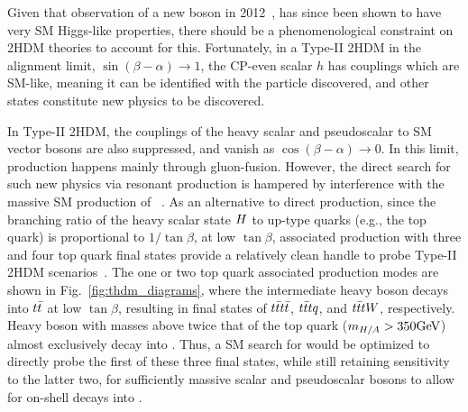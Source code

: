 Given that observation of a new boson in 2012~\cite{CMS:HiggsObservation,ATLAS:HiggsObservation},
has since been shown to have very SM Higgs-like properties,
there should be a phenomenological constraint on 2HDM theories to
account for this. Fortunately, in a Type-II 2HDM in the alignment limit,
$\sin(\beta-\alpha)\rightarrow 1$,
the CP-even scalar $h$ has
couplings which are SM-like, meaning it can be identified with the particle
discovered, and other states constitute new physics to be discovered.

In Type-II 2HDM, the couplings of the heavy scalar and pseudoscalar to SM
vector bosons are also suppressed, and vanish as
$\cos(\beta-\alpha)\rightarrow 0$. In this limit, production happens mainly
through gluon-fusion. However, the direct search for such new physics via
resonant \ttbar production is hampered by interference with the massive SM
production of \ttbar~\cite{THEORY:Gaemers1984sj,THEORY:Dicus1994bm}. As an
alternative to direct production, since the branching ratio of the heavy
scalar state $H$ to up-type quarks (e.g., the top quark) is proportional to
$1/\tan\beta$, at low $\tan\beta$, associated production with three and four
top quark final states provide a relatively clean handle to probe Type-II
2HDM scenarios~\cite{THEORY:Craig2015jba,THEORY:Craig2016ygr}. The one or two top quark
associated production modes are shown in Fig.~\ref{fig:thdm_diagrams}, where
the intermediate heavy boson decays into $t\bar{t}$ at low $\tan\beta$, resulting in
final states of $t\bar{t}t\bar{t}$, $t\bar{t}tq$, and $t\bar{t}tW$, respectively.
Heavy boson with masses above twice that of the top quark ($m_{H/A}>350\text{GeV}$)
almost exclusively decay into \ttbar.
Thus, a SM search for \tttt would be optimized to directly probe the first of these three final states,
while still retaining sensitivity to the latter two, for sufficiently massive 
scalar and pseudoscalar bosons to allow for on-shell decays into \ttbar.

